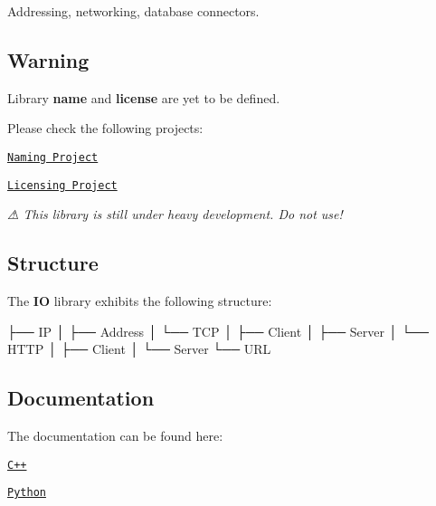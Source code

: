 Addressing, networking, database connectors.

\href{https://travis-ci.com/open-space-collective/library-io}{\tt } \href{https://codecov.io/gh/open-space-collective/library-io}{\tt } \href{https://open-space-collective.github.io/library-io}{\tt } \href{https://badge.fury.io/gh/open-space-collective%2Flibrary-io}{\tt } \href{https://badge.fury.io/py/LibraryIOPy}{\tt }

\subsection*{Warning}

Library {\bfseries name} and {\bfseries license} are yet to be defined.

Please check the following projects\+:


\begin{DoxyItemize}
\item \href{https://github.com/orgs/open-space-collective/projects/1}{\tt Naming Project}
\item \href{https://github.com/orgs/open-space-collective/projects/2}{\tt Licensing Project}
\end{DoxyItemize}

{\itshape ⚠ This library is still under heavy development. Do not use!}

\subsection*{Structure}

The {\bfseries IO} library exhibits the following structure\+:


\begin{DoxyCode}
├── IP
│   ├── Address
│   └── TCP
│       ├── Client
│       ├── Server
│       └── HTTP
│           ├── Client
│           └── Server
└── URL
\end{DoxyCode}


\subsection*{Documentation}

The documentation can be found here\+:


\begin{DoxyItemize}
\item \href{https://open-space-collective.github.io/library-io}{\tt C++}
\item \href{./bindings/python/docs}{\tt Python}
\end{DoxyItemize}

